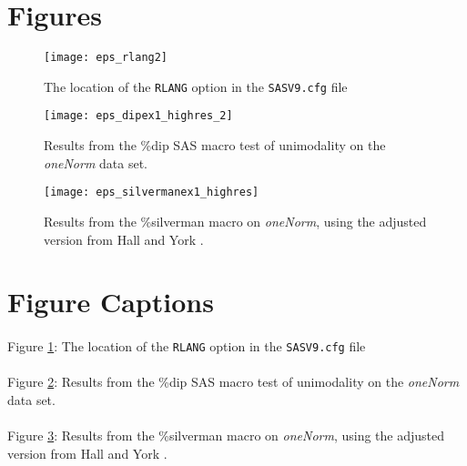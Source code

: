 \documentclass[]{interact}
\theoremstyle{plain}%
\theoremstyle{definition}
\theoremstyle{remark}
\begin{document}
\clearpage
\section{Figures}
\centering
\begin{figure}[h]
\texttt{[image: eps\_rlang2]}
\caption{The location of the \texttt{RLANG} option in the \texttt{SASV9.cfg} file}
\label{fig:rlang}
\end{figure}

\clearpage
\centering
\begin{figure}[h]
\texttt{[image: eps\_dipex1\_highres\_2]}
\caption{Results from the \%dip SAS macro test of unimodality on the \textit{oneNorm} data set.} 
\label{fig:dip}\end{figure}

\clearpage
\centering
\begin{figure}[h]
\texttt{[image: eps\_silvermanex1\_highres]}
\caption{Results from the \%silverman macro on \textit{oneNorm}, using the adjusted version from Hall and York \cite{hall2001calibration}.} 
\label{fig:silv}
\end{figure}

\clearpage
\section{Figure Captions}
\paragraph*{}
Figure \ref{fig:rlang}: The location of the \texttt{RLANG} option in the \texttt{SASV9.cfg} file %

\paragraph*{}
Figure \ref{fig:dip}: Results from the \%dip SAS macro test of unimodality on the \textit{oneNorm} data set. %

\paragraph*{}
Figure \ref{fig:silv}: Results from the \%silverman macro on \textit{oneNorm}, using the adjusted version from Hall and York \cite{hall2001calibration}. %
\end{document}
